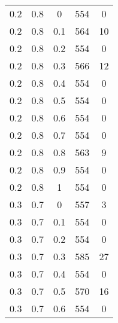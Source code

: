 \begin{table}
\begin{minipage}[h!]{0.10\hsize}
\begin{center}
{\begin{tabular}{|c|c|c|c|c|}
					0.2  & 0.8  & 0    & 554  & 0     \\
					0.2  & 0.8  & 0.1  & 564  & 10     \\
					0.2  & 0.8  & 0.2  & 554  & 0     \\
					0.2  & 0.8  & 0.3  & 566  & 12     \\
					0.2  & 0.8  & 0.4  & 554  & 0     \\
					0.2  & 0.8  & 0.5  & 554  & 0     \\
					0.2  & 0.8  & 0.6  & 554  & 0     \\
					0.2  & 0.8  & 0.7  & 554  & 0     \\
					0.2  & 0.8  & 0.8  & 563  & 9     \\
					0.2  & 0.8  & 0.9  & 554  & 0     \\
					0.2  & 0.8  & 1    & 554  & 0     \\ \hline
					0.3  & 0.7  & 0    & 557  & 3     \\
					0.3  & 0.7  & 0.1  & 554  & 0     \\
					0.3  & 0.7  & 0.2  & 554  & 0   \\
					0.3  & 0.7  & 0.3  & 585  & 27   \\
					0.3  & 0.7  & 0.4  & 554  & 0     \\
					0.3  & 0.7  & 0.5  & 570  & 16     \\
					0.3  & 0.7  & 0.6  & 554  & 0     \\ \hline
			\end{tabular}}
			\label{tab:log2}
		\end{center}
	\end{minipage}
	\hfill
	\begin{minipage}[!h]{0.50\hsize}\centering
		\begin{center}
\end{center}
\end{minipage}
\end{table}
